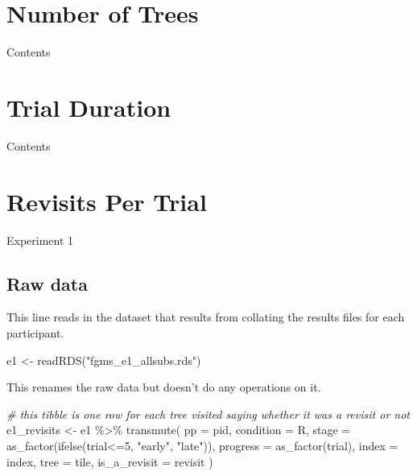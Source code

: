 \documentclass[
]{book}
\newenvironment{Shaded}{\begin{snugshade}}{\end{snugshade}}
\newcommand{\AttributeTok}[1]{\textcolor[rgb]{0.77,0.63,0.00}{#1}}
\newcommand{\CommentTok}[1]{\textcolor[rgb]{0.56,0.35,0.01}{\textit{#1}}}
\newcommand{\DecValTok}[1]{\textcolor[rgb]{0.00,0.00,0.81}{#1}}
\newcommand{\FunctionTok}[1]{\textcolor[rgb]{0.00,0.00,0.00}{#1}}
\newcommand{\NormalTok}[1]{#1}
\newcommand{\OtherTok}[1]{\textcolor[rgb]{0.56,0.35,0.01}{#1}}
\newcommand{\SpecialCharTok}[1]{\textcolor[rgb]{0.00,0.00,0.00}{#1}}
\newcommand{\StringTok}[1]{\textcolor[rgb]{0.31,0.60,0.02}{#1}}
\begin{document}
\hypertarget{number-of-trees}{%
\chapter{Number of Trees}\label{number-of-trees}}

Contents

\hypertarget{trial-duration}{%
\chapter{Trial Duration}\label{trial-duration}}

Contents

\hypertarget{revisits-per-trial}{%
\chapter{Revisits Per Trial}\label{revisits-per-trial}}

Experiment 1

\hypertarget{raw-data}{%
\section{Raw data}\label{raw-data}}

This line reads in the dataset that results from collating the results files for each participant.

\begin{Shaded}
\begin{Highlighting}[]
\NormalTok{e1 }\OtherTok{\textless{}{-}} \FunctionTok{readRDS}\NormalTok{(}\StringTok{"fgms\_e1\_allsubs.rds"}\NormalTok{)}
\end{Highlighting}
\end{Shaded}

This renames the raw data but doesn't do any operations on it.

\begin{Shaded}
\begin{Highlighting}[]
\CommentTok{\# this tibble is one row for each tree visited saying whether it was a revisit or not}
\NormalTok{e1\_revisits }\OtherTok{\textless{}{-}}
\NormalTok{  e1 }\SpecialCharTok{\%\textgreater{}\%}
  \FunctionTok{transmute}\NormalTok{(}
    \AttributeTok{pp           =}\NormalTok{ pid,}
    \AttributeTok{condition    =}\NormalTok{ R,}
    \AttributeTok{stage        =} \FunctionTok{as\_factor}\NormalTok{(}\FunctionTok{ifelse}\NormalTok{(trial}\SpecialCharTok{\textless{}=}\DecValTok{5}\NormalTok{, }\StringTok{"early"}\NormalTok{, }\StringTok{"late"}\NormalTok{)),}
    \AttributeTok{progress     =} \FunctionTok{as\_factor}\NormalTok{(trial),}
    \AttributeTok{index        =}\NormalTok{ index,}
    \AttributeTok{tree         =}\NormalTok{ tile,}
    \AttributeTok{is\_a\_revisit =}\NormalTok{ revisit}
\NormalTok{  )}
\end{Highlighting}
\end{Shaded}
\end{document}
